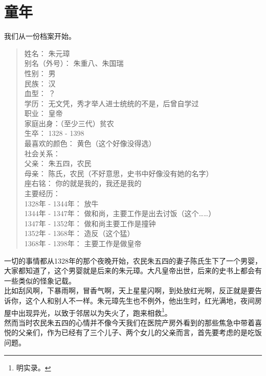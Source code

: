 \section{童年}
\ifnum{}
	\begin{multicols}{\theparacolNo}
\fi
我们从一份档案开始。\\

{\footnotesize \begin{quote}
	姓名： 朱元璋\\
	别名（外号）： 朱重八、朱国瑞\\
	性别： 男\\
	民族： 汉\\
	血型： ？\\
	学历： 无文凭，秀才举人进士统统的不是，后曾自学过\\
	职业： 皇帝\\
	家庭出身：（至少三代）贫农\\
	生卒： 1328 - 1398\\
	最喜欢的颜色： 黄色（这个好像没得选）\\

	社会关系：\\
	父亲： 朱五四，农民\\
	母亲： 陈氏，农民（不好意思，史书中好像没有她的名字）\\
	座右铭： 你的就是我的，我还是我的\\

	主要经历：\\
	1328年 - 1344年： 放牛\\
	1344年 - 1347年： 做和尚，主要工作是出去讨饭（这个……）\\
	1347年 - 1352年： 做和尚主要工作是撞钟\\
	1352年 - 1368年： 造反（这个猛）\\
	1368年 - 1398年： 主要工作是做皇帝\\
\end{quote}}

一切的事情都从1328年的那个夜晚开始，农民朱五四的妻子陈氏生下了一个男婴，大家都知道了，这个男婴就是后来的朱元璋。大凡皇帝出世，后来的史书上都会有一些类似的怪象记载。\\

比如刮风啊，下暴雨啊，冒香气啊，天上星星闪啊，到处放红光啊，反正就是要告诉你，这个人和别人不一样。朱元璋先生也不例外，他出生时，红光满地，夜间房屋中出现异光，以致于邻居以为失火了，跑来相救\footnote{明实录。}。\\

然而当时农民朱五四的心情并不像今天我们在医院产房外看到的那些焦急中带着喜悦的父亲们，作为已经有了三个儿子、两个女儿的父亲而言，首先要考虑的是吃饭问题。\\


\end{multicols}
